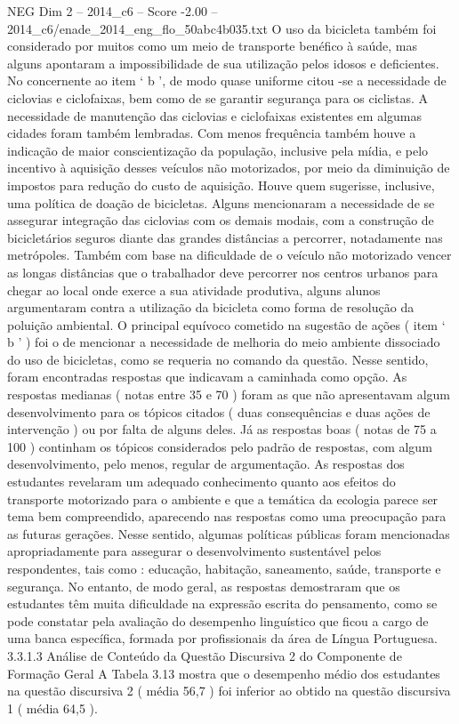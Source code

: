 \begin{textsample}{NEG Dim 2 – 2014\_c6 – Score -2.00 – 2014\_c6/enade\_2014\_eng\_flo\_50abc4b035.txt}
O uso da bicicleta também foi considerado por muitos como um meio de transporte benéfico à saúde, mas alguns apontaram a impossibilidade de sua utilização pelos idosos e deficientes.
No concernente ao item ‘ b ’, de modo quase uniforme citou -se a necessidade de ciclovias e ciclofaixas, bem como de se garantir segurança para os ciclistas.
A necessidade de manutenção das ciclovias e ciclofaixas existentes em algumas cidades foram também lembradas.
Com menos frequência também houve a indicação de maior conscientização da população, inclusive pela mídia, e pelo incentivo à aquisição desses veículos não motorizados, por meio da diminuição de impostos para redução do custo de aquisição.
Houve quem sugerisse, inclusive, uma política de doação de bicicletas.
Alguns mencionaram a necessidade de se assegurar integração das ciclovias com os demais modais, com a construção de bicicletários seguros diante das grandes distâncias a percorrer, notadamente nas metrópoles.
Também com base na dificuldade de o veículo não motorizado vencer as longas distâncias que o trabalhador deve percorrer nos centros urbanos para chegar ao local onde exerce a sua atividade produtiva, alguns alunos argumentaram contra a utilização da bicicleta como forma de resolução da poluição ambiental.
O principal equívoco cometido na sugestão de ações ( item ‘ b ’ ) foi o de mencionar a necessidade de melhoria do meio ambiente dissociado do uso de bicicletas, como se requeria no comando da questão.
Nesse sentido, foram encontradas respostas que indicavam a caminhada como opção.
As respostas medianas ( notas entre 35 e 70 ) foram as que não apresentavam algum desenvolvimento para os tópicos citados ( duas consequências e duas ações de intervenção ) ou por falta de alguns deles.
Já as respostas boas ( notas de 75 a 100 ) continham os tópicos considerados pelo padrão de respostas, com algum desenvolvimento, pelo menos, regular de argumentação.
As respostas dos estudantes revelaram um adequado conhecimento quanto aos efeitos do transporte motorizado para o ambiente e que a temática da ecologia parece ser tema bem compreendido, aparecendo nas respostas como uma preocupação para as futuras gerações.
Nesse sentido, algumas políticas públicas foram mencionadas apropriadamente para assegurar o desenvolvimento sustentável pelos respondentes, tais como : educação, habitação, saneamento, saúde, transporte e segurança.
No entanto, de modo geral, as respostas demostraram que os estudantes têm muita dificuldade na expressão escrita do pensamento, como se pode constatar pela avaliação do desempenho linguístico que ficou a cargo de uma banca específica, formada por profissionais da área de Língua Portuguesa. 3.3.1.3 Análise de Conteúdo da Questão Discursiva 2 do Componente de Formação Geral A Tabela 3.13 mostra que o desempenho médio dos estudantes na questão discursiva 2 ( média 56,7 ) foi inferior ao obtido na questão discursiva 1 ( média 64,5 ).

\end{textsample}
